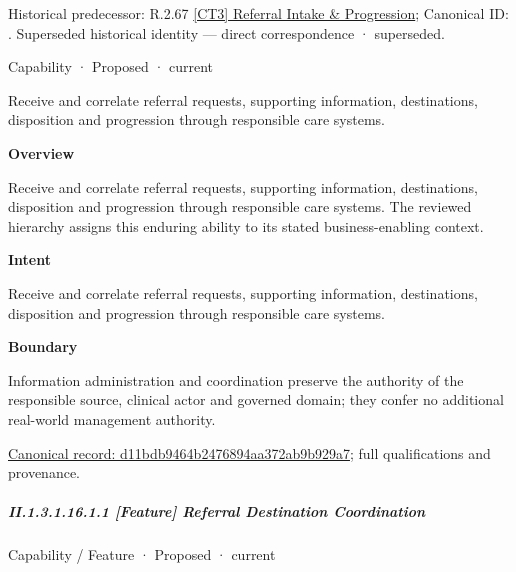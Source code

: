{\small Historical predecessor: R.2.67 \hyperref[element:7180f6265d5c4687a001220c6126e301]{[CT3] Referral Intake \& Progression}; Canonical ID: \texttt{}. Superseded historical identity — direct correspondence · superseded.}\par
\label{element:d11bdb9464b2476894aa372ab9b929a7}
{\small Capability · Proposed · current}\par

Receive and correlate referral requests, supporting information, destinations, disposition and progression through responsible care systems.



\textbf{Overview}



Receive and correlate referral requests, supporting information, destinations, disposition and progression through responsible care systems. The reviewed hierarchy assigns this enduring ability to its stated business-enabling context.



\textbf{Intent}



Receive and correlate referral requests, supporting information, destinations, disposition and progression through responsible care systems.



\textbf{Boundary}



Information administration and coordination preserve the authority of the responsible source, clinical actor and governed domain; they confer no additional real-world management authority.


{\footnotesize \href{../../../../continuum/strategy/capability/d11bdb9464b2476894aa372ab9b929a7.md}{Canonical record: d11bdb9464b2476894aa372ab9b929a7}; full qualifications and provenance.}\par
\subparagraph*{II.1.3.1.16.1.1 [Feature] Referral Destination Coordination}
\label{navigation:II.1.3.1.16.1.1}

\label{element:7d7ddffcda9d4854a02be5c3265ad775}
{\small Capability / Feature · Proposed · current}\par


